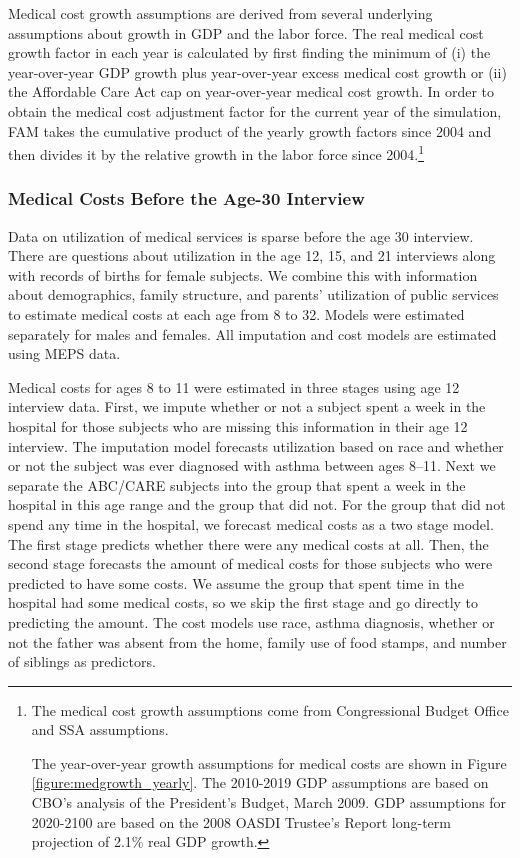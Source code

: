 \noindent Medical cost growth assumptions are derived from several underlying assumptions about growth in GDP and the labor force. The real medical cost growth factor in each year is calculated by first finding the minimum of (i) the year-over-year GDP growth plus year-over-year excess medical cost growth or (ii) the Affordable Care Act cap on year-over-year medical cost growth. In order to obtain the medical cost adjustment factor for the current year of the simulation, FAM takes the cumulative product of the yearly growth factors since 2004 and then divides it by the relative growth in the labor force since 2004.\footnote{The medical cost growth assumptions come from Congressional Budget Office and SSA assumptions.

The year-over-year growth assumptions for medical costs are shown in Figure \ref{figure:medgrowth_yearly}.
The 2010-2019 GDP assumptions are based on CBO's analysis of the President's Budget, March 2009.
GDP assumptions for 2020-2100 are based on the 2008 OASDI Trustee's Report long-term projection of 2.1\% real GDP growth.}

\subsubsection{Medical Costs Before the Age-30 Interview}
\label{appendix:health-costs-before-age30}

\noindent Data on utilization of medical services is sparse before the age 30 interview. There are questions about utilization in the age 12, 15, and 21 interviews along with records of births for female subjects. We combine this with information about demographics, family structure, and parents' utilization of public services to estimate medical costs at each age from 8 to 32. Models were estimated separately for males and females. All imputation and cost models are estimated using MEPS data.

\noindent Medical costs for ages 8 to 11 were estimated in three stages using age 12 interview data. First, we impute whether or not a subject spent a week in the hospital for those subjects who are missing this information in their age 12 interview. The imputation model forecasts utilization based on race and whether or not the subject was ever diagnosed with asthma between ages 8--11. Next we separate the ABC/CARE subjects into the group that spent a week in the hospital in this age range and the group that did not. For the group that did not spend any time in the hospital, we forecast medical costs as a two stage model. The first stage predicts whether there were any medical costs at all. Then, the second stage forecasts the amount of medical costs for those subjects who were predicted to have some costs. We assume the group that spent time in the hospital had some medical costs, so we skip the first stage and go directly to predicting the amount. The cost models use race, asthma diagnosis, whether or not the father was absent from the home, family use of food stamps, and number of siblings as predictors.

